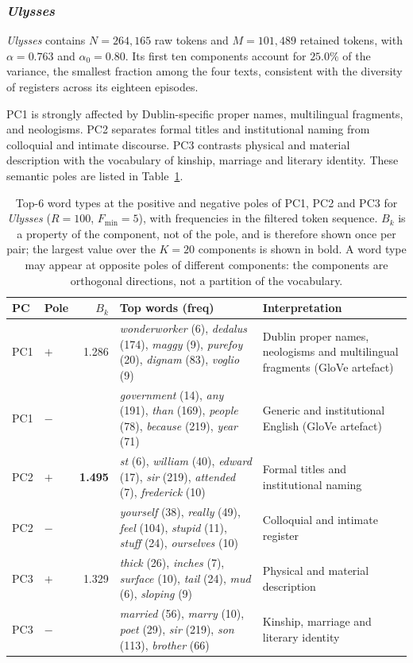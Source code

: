 \documentclass[preprint]{elsarticle}
\begin{document}
\subsubsection{\emph{Ulysses}}
\label{sec:ulysses}

\emph{Ulysses} contains $N=264{,}165$ raw tokens and $M=101{,}489$
retained tokens, with $\alpha=0.763$ and $\alpha_0=0.80$. Its first
ten components account for $25.0\%$ of the variance, the smallest
fraction among the four texts, consistent with the diversity of
registers across its eighteen episodes.

PC1 is strongly affected by Dublin-specific proper names,
multilingual fragments, and neologisms. PC2 separates formal titles and
institutional naming from colloquial and intimate discourse. PC3
contrasts physical and material description with the vocabulary of
kinship, marriage and literary identity. These semantic poles are
listed in Table~\ref{tab:ulysses_pc}.

\begin{table}[tbp]
\centering
\caption{Top-6 word types at the positive and negative poles of PC1,
PC2 and PC3 for \emph{Ulysses} ($R=100$, $F_{\min}=5$), with
frequencies in the filtered token sequence.
$B_k$ is a property of the component, not of the pole, and is therefore
shown once per pair; the largest value over the $K=20$ components is
shown in bold.
A word type may appear at opposite poles of different components: the
components are orthogonal directions, not a partition of the
vocabulary.}
\label{tab:ulysses_pc}
\small
\setlength{\tabcolsep}{4pt}
\begin{tabular}{llr p{5.4cm} p{4.4cm}}
\toprule
PC & Pole & $B_k$ & Top words (freq) & Interpretation \\
\midrule
PC1 & $+$ & 1.286 &
  \emph{wonderworker} (6), \emph{dedalus} (174), \emph{maggy} (9),
  \emph{purefoy} (20), \emph{dignam} (83), \emph{voglio} (9)
  & Dublin proper names, neologisms and multilingual fragments
    (GloVe artefact) \\
PC1 & $-$ & &
  \emph{government} (14), \emph{any} (191), \emph{than} (169),
  \emph{people} (78), \emph{because} (219), \emph{year} (71)
  & Generic and institutional English (GloVe artefact) \\
\midrule
PC2 & $+$ & \textbf{1.495} &
  \emph{st} (6), \emph{william} (40), \emph{edward} (17),
  \emph{sir} (219), \emph{attended} (7), \emph{frederick} (10)
  & Formal titles and institutional naming \\
PC2 & $-$ & &
  \emph{yourself} (38), \emph{really} (49), \emph{feel} (104),
  \emph{stupid} (11), \emph{stuff} (24), \emph{ourselves} (10)
  & Colloquial and intimate register \\
\midrule
PC3 & $+$ & 1.329 &
  \emph{thick} (26), \emph{inches} (7), \emph{surface} (10),
  \emph{tail} (24), \emph{mud} (6), \emph{sloping} (9)
  & Physical and material description \\
PC3 & $-$ & &
  \emph{married} (56), \emph{marry} (10), \emph{poet} (29),
  \emph{sir} (219), \emph{son} (113), \emph{brother} (66)
  & Kinship, marriage and literary identity \\
\bottomrule
\end{tabular}
\end{table}
\end{document}
